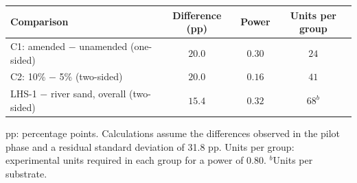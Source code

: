 \begin{tabular}{lccc}
\hline\hline
\textbf{Comparison} & \textbf{Difference (pp)} & \textbf{Power} & \textbf{Units per group} \\
\hline
C1: amended $-$ unamended (one-sided) & $20.0$ & $0.30$ & $24$ \\
C2: 10\% $-$ 5\% (two-sided) & $20.0$ & $0.16$ & $41$ \\
LHS-1 $-$ river sand, overall (two-sided) & $15.4$ & $0.32$ & $68^{b}$ \\
\hline
\end{tabular}
\par\vspace{4pt}
\parbox{0.94\linewidth}{\footnotesize pp: percentage points. Calculations assume the differences observed in the pilot phase and a residual standard deviation of 31.8 pp. Units per group: experimental units required in each group for a power of 0.80. $^{b}$Units per substrate.}
